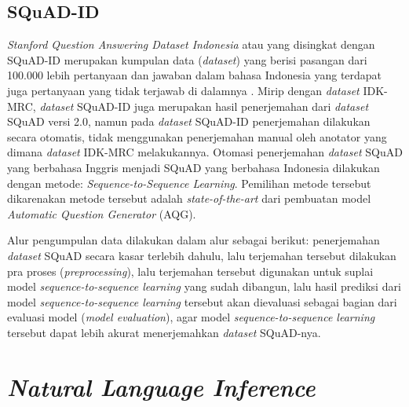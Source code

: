 \subsection{SQuAD-ID}
\emph{Stanford Question Answering Dataset Indonesia} atau yang disingkat dengan SQuAD-ID merupakan kumpulan data (\emph{dataset}) yang berisi pasangan dari 100.000 lebih pertanyaan dan jawaban dalam bahasa Indonesia yang terdapat juga pertanyaan yang tidak terjawab di dalamnya \citep{muis2020sequencetosequence}. Mirip dengan \emph{dataset} IDK-MRC, \emph{dataset} SQuAD-ID juga merupakan hasil penerjemahan dari \emph{dataset} SQuAD versi 2.0, namun pada \emph{dataset} SQuAD-ID penerjemahan dilakukan secara otomatis, tidak menggunakan penerjemahan manual oleh anotator yang dimana \emph{dataset} IDK-MRC melakukannya. Otomasi penerjemahan \emph{dataset} SQuAD yang berbahasa Inggris menjadi SQuAD yang berbahasa Indonesia dilakukan dengan metode: \emph{Sequence-to-Sequence Learning}. Pemilihan metode tersebut dikarenakan metode tersebut adalah \emph{state-of-the-art} dari pembuatan model \emph{Automatic Question Generator} (AQG). 

Alur pengumpulan data dilakukan dalam alur sebagai berikut: penerjemahan \emph{dataset} SQuAD secara kasar terlebih dahulu, lalu terjemahan tersebut dilakukan pra proses (\emph{preprocessing}), lalu terjemahan tersebut digunakan untuk suplai model \emph{sequence-to-sequence learning} yang sudah dibangun, lalu hasil prediksi dari model \emph{sequence-to-sequence learning} tersebut akan dievaluasi sebagai bagian dari evaluasi model (\emph{model evaluation}), agar model \emph{sequence-to-sequence learning} tersebut dapat lebih akurat menerjemahkan \emph{dataset} SQuAD-nya.

\section{\emph{Natural Language Inference}}

